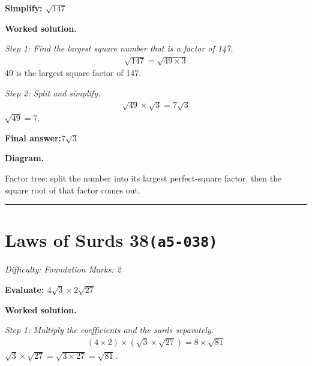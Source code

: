\documentclass[11pt]{article}
\newcommand{\question}[1]{\par\medskip\noindent\textbf{#1}\par}
\begin{document}
\question{Simplify: \( \sqrt{147} \)}

\textbf{Worked solution.}

\textit{Step 1: Find the largest square number that is a factor of 147.}
\[\begin{gathered}
\sqrt{147} = \sqrt{49 \times 3}
\end{gathered}\]
49 is the largest square factor of 147.

\textit{Step 2: Split and simplify.}
\[\begin{gathered}
\sqrt{49} \times \sqrt{3} = 7\sqrt{3}
\end{gathered}\]
\( \sqrt{49} = 7 \).

\begin{answerbox}
\textbf{Final answer:}\quad \(\displaystyle 7\sqrt{3}\)
\end{answerbox}
\textbf{Diagram.}

\begin{center}
\end{center}
\small Factor tree: split the number into its largest perfect-square factor, then the square root of that factor comes out.\normalsize

\medskip\hrule

\section*{Laws of Surds 38\quad\small\texttt{(a5-038)}}
\textit{Difficulty: Foundation \quad\textbar\quad Marks: 2}

\question{Evaluate: \( 4\sqrt{3} \times 2\sqrt{27} \)}

\textbf{Worked solution.}

\textit{Step 1: Multiply the coefficients and the surds separately.}
\[\begin{gathered}
(4 \times 2) \times (\sqrt{3} \times \sqrt{27}) = 8 \times \sqrt{81}
\end{gathered}\]
\( \sqrt{3} \times \sqrt{27} = \sqrt{3 \times 27} = \sqrt{81} \).
\end{document}
